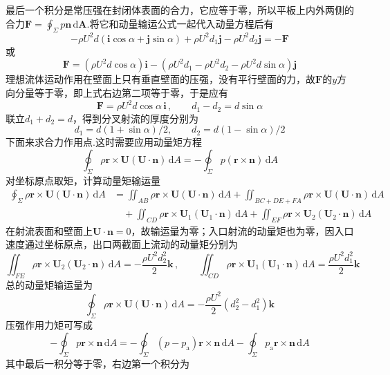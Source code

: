 最后一个积分是常压强在封闭体表面的合力，它应等于零，所以平板上内外两侧的合力$\boldsymbol{F}=\displaystyle\oint_\Sigma p\boldsymbol{n}\,\mathrm{d}\boldsymbol{A}$.将它和动量输运公式一起代入动量方程后有
\[
-\rho U^{2}d(\boldsymbol{i}\cos\alpha+\boldsymbol{j}\sin\alpha)+\rho U^{2}d_1\boldsymbol{j}-\rho U^{2}d_2\boldsymbol{j}=-\boldsymbol{F}
\]
或
\[
\boldsymbol{F}=(\rho U^{2}d\cos\alpha)\boldsymbol{i}-(\rho U^{2}d_1-\rho U^{2}d_2-\rho U^{2}d\sin\alpha)\boldsymbol{j}
\]
理想流体运动作用在壁面上只有垂直壁面的压强，没有平行壁面的力，故$\boldsymbol{F}$的$y$方向分量等于零，即上式右边第二项等于零，于是应有
\[
\boldsymbol{F}=\rho U^{2}d\cos\alpha\,\boldsymbol{i}\,,\qquad d_1-d_2=d\sin\alpha
\]
联立$d_1+d_2=d$，得到分叉射流的厚度分别为
\[
d_1=d(1+\sin\alpha)/2,\qquad d_2=d(1-\sin\alpha)/2
\]
下面来求合力作用点.这时需要应用动量矩方程
\[
\oint_\Sigma \rho\boldsymbol{r}\times\boldsymbol{U}(\boldsymbol{U}\cdot\boldsymbol{n})\,\mathrm{d}A=-\oint_\Sigma p(\boldsymbol{r}\times\boldsymbol{n})\,\mathrm{d}A
\]
对坐标原点取矩，计算动量矩输运量
\begin{align*}
\oint_\Sigma \rho\boldsymbol{r}\times\boldsymbol{U}(\boldsymbol{U}\cdot\boldsymbol{n})\,\mathrm{d}A&=\iint_{AB}\rho\boldsymbol{r}\times\boldsymbol{U}(\boldsymbol{U}\cdot\boldsymbol{n})\,\mathrm{d}A+\iint_{BC+DE+FA}\rho\boldsymbol{r}\times\boldsymbol{U}(\boldsymbol{U}\cdot\boldsymbol{n})\,\mathrm{d}A\\
&\quad+\iint_{CD}\rho\boldsymbol{r}\times\boldsymbol{U}_1(\boldsymbol{U}_1\cdot\boldsymbol{n})\,\mathrm{d}A+\iint_{EF}\rho\boldsymbol{r}\times\boldsymbol{U}_2(\boldsymbol{U}_2\cdot\boldsymbol{n})\,\mathrm{d}A
\end{align*}
在射流表面和壁面上$\boldsymbol{U}\cdot\boldsymbol{n}=0$，故输运量为零；入口射流的动量矩也为零，因入口速度通过坐标原点，出口两截面上流动的动量矩分别为
\[
\iint_{FE}\rho\boldsymbol{r}\times\boldsymbol{U}_2(\boldsymbol{U}_2\cdot\boldsymbol{n})\,\mathrm{d}A=-\frac{\rho U^{2}d_2^{2}}{2}\boldsymbol{k}\,,\qquad
\iint_{CD}\rho\boldsymbol{r}\times\boldsymbol{U}_1(\boldsymbol{U}_1\cdot\boldsymbol{n})\,\mathrm{d}A=\frac{\rho U^{2}d_1^{2}}{2}\boldsymbol{k}
\]
总的动量矩输运量为
\[
\oint_\Sigma \rho\boldsymbol{r}\times\boldsymbol{U}(\boldsymbol{U}\cdot\boldsymbol{n})\,\mathrm{d}A=-\frac{\rho U^{2}}{2}(d_2^{2}-d_1^{2})\boldsymbol{k}
\]
压强作用力矩可写成
\[
-\oint_\Sigma p\boldsymbol{r}\times\boldsymbol{n}\,\mathrm{d}A=-\oint_\Sigma(p-p_{\mathrm{a}})\boldsymbol{r}\times\boldsymbol{n}\,\mathrm{d}A-\oint_\Sigma p_{\mathrm{a}}\boldsymbol{r}\times\boldsymbol{n}\,\mathrm{d}A
\]
其中最后一积分等于零，右边第一个积分为

